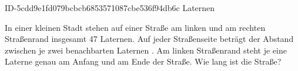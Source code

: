 \begin{exercise}
      {ID-5cdd9e1fd079bcbcb6853571087cbe536f94db6c}
      {Laternen}
  \ifproblem\problem\par
    In einer kleinen Stadt stehen auf einer Straße am linken und am rechten
    Straßenrand insgesamt 47 Laternen.
    Auf jeder Straßenseite beträgt der Abstand zwischen je zwei benachbarten
    Laternen .
    Am linken Straßenrand steht je eine Laterne genau am Anfang und am Ende
    der Straße.
    Wie lang ist die Straße?
  \fi
\end{exercise}
